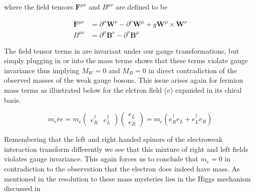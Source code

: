 where the field tensors $\boldsymbol{F}^{\mu\nu}$ and $B^{\mu\nu}$ are defined
to be

\begin{align}
\boldsymbol{F}^{\mu\nu}  &= \partial^{\mu}\boldsymbol{W}^{\nu} -
\partial^{\nu}\boldsymbol{W}^{\mu} + g\boldsymbol{W}^{\mu} \times
\boldsymbol{W}^{\nu} \\
B^{\mu\nu} &=  \partial^{\mu}\boldsymbol{B}^{\nu} -
\partial^{\nu}\boldsymbol{B}^{\mu}
\end{align}

The field tensor terms in  are invariant
under our gauge transformations, but simply plugging in
 or  into the mass terms shows that
these terms violate gauge invariance thus implying $M_{W} = 0$ and $M_{B} = 0$
in direct contradiction of the observed masses of the weak gauge bosons.  This
issue arises again for fermion mass terms as illustrated below for the elctron
field ($e$) expanded in its chiral basis.

\begin{equation}
m_{e}\bar{e}e = m_{e} \left( \begin{matrix}e^{\dagger}_{R} &
e^{\dagger}_{L} \end{matrix} \right) \left( \begin{matrix} e_{L}
\\ e_{R} \end{matrix} \right) = m_{e}(e^{\dagger}_{R}e_{L} +
e^{\dagger}_{L}e_{R})
\end{equation}

Remembering that the left and right handed spinors of the electroweak
interaction transform differently we see that this mixture of right and left
fields violates gauge invariance. This again forces us to conclude that $m_{e} = 0$
in contradiction to the observation that the electron does indeed have mass. As
mentioned in  the resolution to these mass
mysteries lies in the Higgs mechanism discussed in
